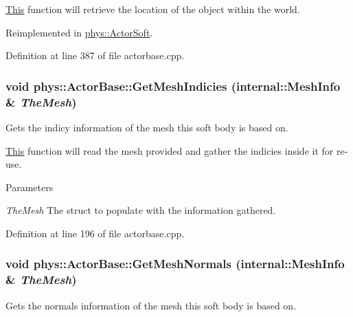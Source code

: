 \hyperlink{structThis}{This} function will retrieve the location of the object within the world. 

Reimplemented in \hyperlink{classphys_1_1ActorSoft_afdbd6ae49e3838190e5481796e650ce8}{phys::ActorSoft}.



Definition at line 387 of file actorbase.cpp.

\hypertarget{classphys_1_1ActorBase_acc1e51ff56ec8c9320bcbd4c3cec3f34}{
\subsubsection[{GetMeshIndicies}]{\setlength{\rightskip}{0pt plus 5cm}void phys::ActorBase::GetMeshIndicies ({\bf internal::MeshInfo} \& {\em TheMesh})}}
\label{d8/d0f/classphys_1_1ActorBase_acc1e51ff56ec8c9320bcbd4c3cec3f34}


Gets the indicy information of the mesh this soft body is based on. 

\hyperlink{structThis}{This} function will read the mesh provided and gather the indicies inside it for re-\/use. 
\begin{DoxyParams}{Parameters}
\item[{\em TheMesh}]The struct to populate with the information gathered. \end{DoxyParams}


Definition at line 196 of file actorbase.cpp.

\hypertarget{classphys_1_1ActorBase_a6f6c1ede5fdf787bcc3f34feddacebff}{
\subsubsection[{GetMeshNormals}]{\setlength{\rightskip}{0pt plus 5cm}void phys::ActorBase::GetMeshNormals ({\bf internal::MeshInfo} \& {\em TheMesh})}}
\label{d8/d0f/classphys_1_1ActorBase_a6f6c1ede5fdf787bcc3f34feddacebff}


Gets the normals information of the mesh this soft body is based on. 

